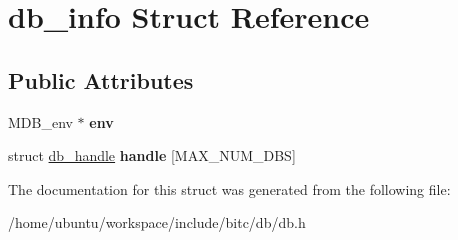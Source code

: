 \hypertarget{structdb__info}{\section{db\-\_\-info Struct Reference}
\label{structdb__info}
}
\subsection*{Public Attributes}
\begin{DoxyCompactItemize}
\item 
\hypertarget{structdb__info_ac0d5ba8040a66525fe7c32afb8e2f65d}{M\-D\-B\-\_\-env $\ast$ {\bfseries env}}\label{structdb__info_ac0d5ba8040a66525fe7c32afb8e2f65d}

\item 
\hypertarget{structdb__info_ae861265757ba2a2aba5ee8294c7038fe}{struct \hyperlink{structdb__handle}{db\-\_\-handle} {\bfseries handle} \mbox{[}M\-A\-X\-\_\-\-N\-U\-M\-\_\-\-D\-B\-S\mbox{]}}\label{structdb__info_ae861265757ba2a2aba5ee8294c7038fe}

\end{DoxyCompactItemize}


The documentation for this struct was generated from the following file\-:\begin{DoxyCompactItemize}
\item 
/home/ubuntu/workspace/include/bitc/db/db.\-h\end{DoxyCompactItemize}
